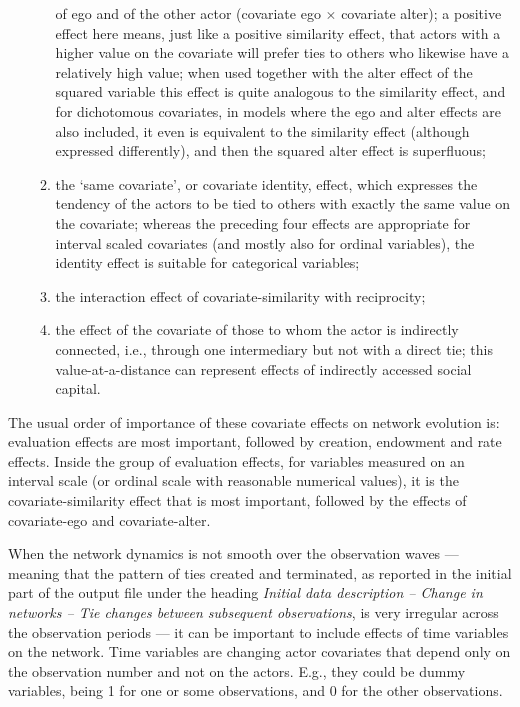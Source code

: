 \documentclass[a4paper,fleqn,11pt]{article}
\newcommand{\+}{\, + \,}
\begin{document}
\begin{itemize}
\begin{enumerate}
      of ego and of the other actor (covariate ego $\times$ covariate alter);
      a positive effect here means, just like a positive similarity effect,
      that actors with a higher value on the covariate
      will prefer ties to others who likewise have a relatively high
      value;
      when used together with the alter effect of the squared variable
      this effect is quite analogous to the similarity effect,
      and for dichotomous covariates, in models where the ego and
      alter effects are also included, it even is equivalent
      to the similarity effect (although expressed differently),
      and then the squared alter effect is superfluous;
\item the `same covariate', or covariate identity, effect, which expresses the tendency of the
      actors to be tied to others with exactly the same value on the covariate;
      whereas the preceding four effects are appropriate for interval scaled
      covariates (and mostly also for ordinal variables),
      the identity effect is suitable for categorical variables;
\item the interaction effect of covariate-similarity with reciprocity;
\item the effect of the covariate of those to whom the actor is
      indirectly connected, i.e., through one intermediary but not
      with a direct tie; this value-at-a-distance can represent
      effects of indirectly accessed social capital.
\end{enumerate}
\end{itemize}
The usual order of importance of these covariate effects on
network evolution is: evaluation effects are most important, followed
by creation, endowment and rate effects. Inside the group of evaluation
effects, for variables measured on an interval scale
(or ordinal scale with reasonable numerical values),
it is the covariate-similarity effect that is most
important, followed by the effects of covariate-ego and
covariate-alter.

When the network dynamics is not smooth over the observation waves --- meaning that
the pattern of ties created and terminated, as reported in the initial part of the output
file under the heading \emph{Initial data description -- Change in networks --
Tie changes between subsequent observations},
is very irregular across the observation periods --- it can be important to include
effects of time variables on the network.
Time variables are changing actor covariates that depend only on the
observation number and not on the actors. E.g., they could be dummy variables,
being 1 for one or some observations, and 0 for the other observations.
\end{document}
